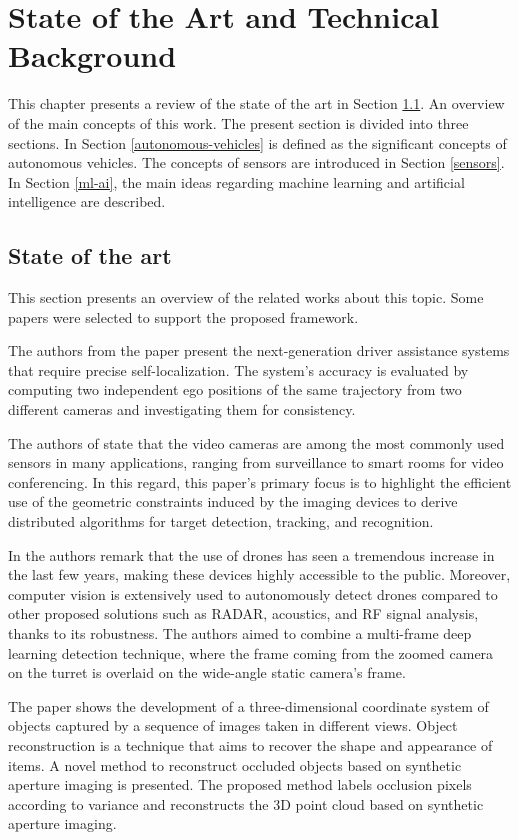 \chapter{State of the Art and Technical Background}
\label{capitulo3}

This chapter presents a review of the state of the art in Section \ref{capitulo2}. An overview of the main concepts of this work. The present section is divided into three sections. In Section \ref{autonomous-vehicles} is defined as the significant concepts of autonomous vehicles. The concepts of sensors are introduced in Section \ref{sensors}. In Section \ref{ml-ai}, the main ideas regarding machine learning and artificial intelligence are described.

\section{State of the art} \label{capitulo2}

This section presents an overview of the related works about this topic. Some papers were selected to support the proposed framework.

The authors from the paper \cite{Lategahn2013} present the next-generation driver assistance systems that require precise self-localization. The system's accuracy is evaluated by computing two independent ego positions of the same trajectory from two different cameras and investigating them for consistency.

The authors of \cite{Sankaranarayanan2008} state that the video cameras are among the most commonly used sensors in many applications, ranging from surveillance to smart rooms for video conferencing. In this regard, this paper's primary focus is to highlight the efficient use of the geometric constraints induced by the imaging devices to derive distributed algorithms for target detection, tracking, and recognition.

In \cite{Unlu2019} the authors remark that the use of drones has seen a tremendous increase in the last few years, making these devices highly accessible to the public. Moreover, computer vision is extensively used to autonomously detect drones compared to other proposed solutions such as RADAR, acoustics, and RF signal analysis, thanks to its robustness. The authors aimed to combine a multi-frame deep learning detection technique, where the frame coming from the zoomed camera on the turret is overlaid on the wide-angle static camera's frame.

The paper \cite{Pei2019} shows the development of a three-dimensional coordinate system of objects captured by a sequence of images taken in different views. Object reconstruction is a technique that aims to recover the shape and appearance of items. A novel method to reconstruct occluded objects based on synthetic aperture imaging is presented. The proposed method labels occlusion pixels according to variance and reconstructs the 3D point cloud based on synthetic aperture imaging.


